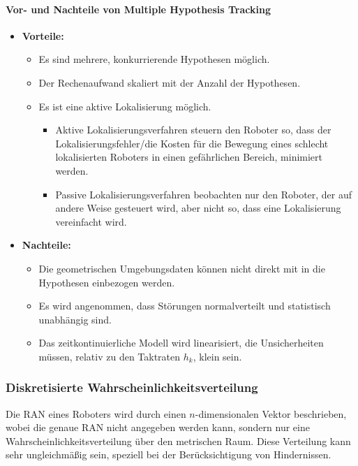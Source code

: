 				\paragraph{Vor- und Nachteile von Multiple Hypothesis Tracking}
					\begin{itemize}
						\item \textbf{Vorteile:}
							\begin{itemize}
								\item Es sind mehrere, konkurrierende Hypothesen möglich.
								\item Der Rechenaufwand skaliert mit der Anzahl der Hypothesen.
								\item Es ist eine aktive Lokalisierung möglich.
									\begin{itemize}
										\item Aktive Lokalisierungsverfahren steuern den Roboter so, dass der Lokalisierungsfehler/die Kosten für die Bewegung eines schlecht lokalisierten Roboters in einen gefährlichen Bereich, minimiert werden.
										\item Passive Lokalisierungsverfahren beobachten nur den Roboter, der auf andere Weise gesteuert wird, aber nicht so, dass eine Lokalisierung vereinfacht wird.
									\end{itemize}
							\end{itemize}
						\item \textbf{Nachteile:}
							\begin{itemize}
								\item Die geometrischen Umgebungsdaten können nicht direkt mit in die Hypothesen einbezogen werden.
								\item Es wird angenommen, dass Störungen normalverteilt und statistisch unabhängig sind.
								\item Das zeitkontinuierliche Modell wird linearisiert, \dh die Unsicherheiten müssen, relativ zu den Taktraten \( h_k \), klein sein.
							\end{itemize}
					\end{itemize}

			\subsubsection{Diskretisierte Wahrscheinlichkeitsverteilung}
				Die RAN eines Roboters wird durch einen \(n\)-dimensionalen Vektor beschrieben, wobei die genaue RAN nicht angegeben werden kann, sondern nur eine Wahrscheinlichkeitsverteilung über den metrischen Raum. Diese Verteilung kann sehr ungleichmäßig sein, speziell bei der Berücksichtigung von Hindernissen.
				
